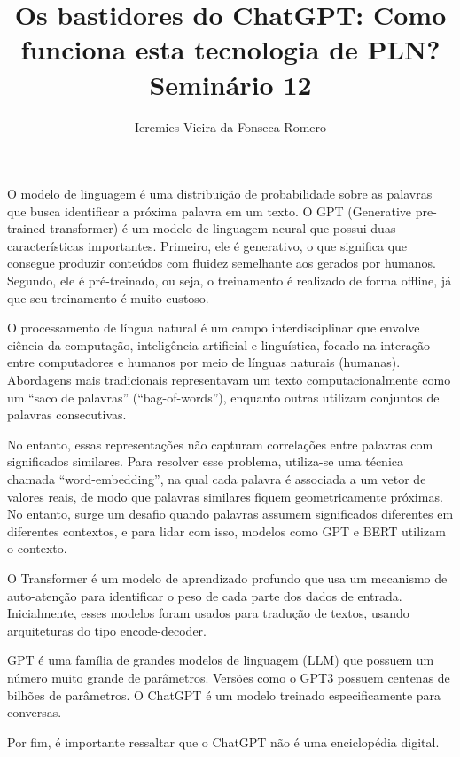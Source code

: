 \documentclass[11pt]{article}
\author{Ieremies Vieira da Fonseca Romero}
\date{}
\title{Os bastidores do ChatGPT: Como funciona esta tecnologia de PLN?\\\medskip
\large Seminário 12}
\begin{document}
\maketitle
O modelo de linguagem é uma distribuição de probabilidade sobre as palavras que busca identificar a próxima palavra em um texto. O GPT (Generative pre-trained transformer) é um modelo de linguagem neural que possui duas características importantes. Primeiro, ele é generativo, o que significa que consegue produzir conteúdos com fluidez semelhante aos gerados por humanos. Segundo, ele é pré-treinado, ou seja, o treinamento é realizado de forma offline, já que seu treinamento é muito custoso.

O processamento de língua natural é um campo interdisciplinar que envolve ciência da computação, inteligência artificial e linguística, focado na interação entre computadores e humanos por meio de línguas naturais (humanas). Abordagens mais tradicionais representavam um texto computacionalmente como um ``saco de palavras'' (``bag-of-words''), enquanto outras utilizam conjuntos de palavras consecutivas.

No entanto, essas representações não capturam correlações entre palavras com significados similares. Para resolver esse problema, utiliza-se uma técnica chamada ``word-embedding'', na qual cada palavra é associada a um vetor de valores reais, de modo que palavras similares fiquem geometricamente próximas. No entanto, surge um desafio quando palavras assumem significados diferentes em diferentes contextos, e para lidar com isso, modelos como GPT e BERT utilizam o contexto.

O Transformer é um modelo de aprendizado profundo que usa um mecanismo de auto-atenção para identificar o peso de cada parte dos dados de entrada. Inicialmente, esses modelos foram usados para tradução de textos, usando arquiteturas do tipo encode-decoder.

GPT é uma família de grandes modelos de linguagem (LLM) que possuem um número muito grande de parâmetros. Versões como o GPT3 possuem centenas de bilhões de parâmetros. O ChatGPT é um modelo treinado especificamente para conversas.

Por fim, é importante ressaltar que o ChatGPT não é uma enciclopédia digital.
\end{document}
